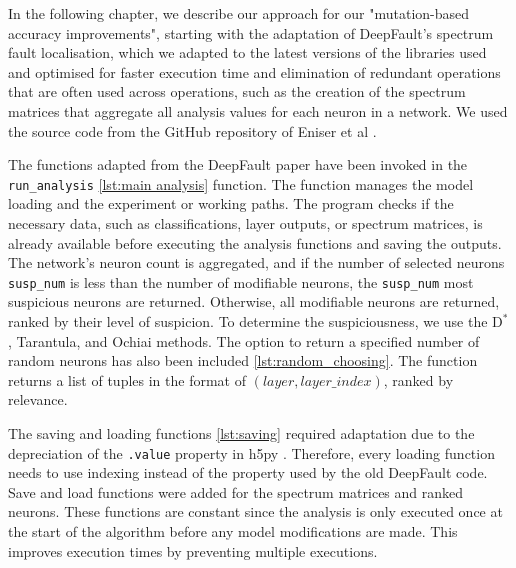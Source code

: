 In the following chapter, we describe our approach for our "mutation-based accuracy improvements", starting with the adaptation of DeepFault's \cite{eniser_deepfault_2019} spectrum fault localisation, which we adapted to the latest versions of the libraries used and optimised for faster execution time and elimination of redundant operations that are often used across operations, such as the creation of the spectrum matrices that aggregate all analysis values for each neuron in a network.
We used the source code from the GitHub repository of Eniser et al \cite{eniser_deepfault_2023}.

The functions adapted from the DeepFault paper have been invoked in the \texttt{run\_analysis} \ref{lst:main analysis} function.
The function manages the model loading and the experiment or working paths.
The program checks if the necessary data, such as classifications, layer outputs, or spectrum matrices, is already available before executing the analysis functions and saving the outputs.
The network's neuron count is aggregated, and if the number of selected neurons \texttt{susp\_num} is less than the number of modifiable neurons, the \texttt{susp\_num} most suspicious neurons are returned.
Otherwise, all modifiable neurons are returned, ranked by their level of suspicion.
To determine the suspiciousness, we use the $\text{D}^*$, Tarantula, and Ochiai methods.
The option to return a specified number of random neurons has also been included \ref{lst:random_choosing}.
The function returns a list of tuples in the format of $(layer, layer\_index)$, ranked by relevance.




The saving and loading functions \ref{lst:saving} required adaptation due to the depreciation of the \texttt{.value} property in h5py \cite{collette_h5pyh5py_2022}.
Therefore, every loading function needs to use indexing instead of the property used by the old DeepFault code.
Save and load functions were added for the spectrum matrices and ranked neurons.
These functions are constant since the analysis is only executed once at the start of the algorithm before any model modifications are made.
This improves execution times by preventing multiple executions.



